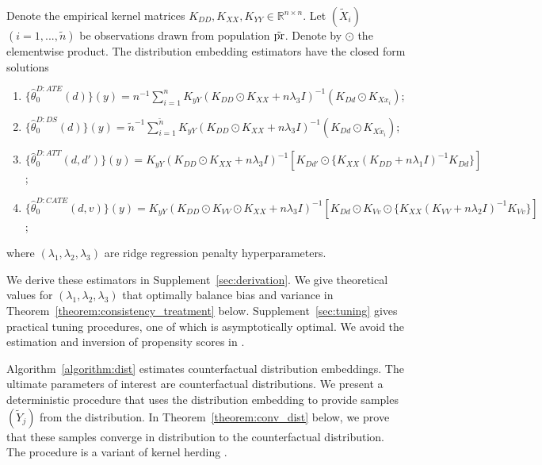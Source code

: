\begin{algorithm}\label{algorithm:dist}
Denote the empirical kernel matrices
$
K_{DD}, K_{XX}, K_{YY}\in\mathbb{R}^{n\times n}
$. Let $(\tilde{X}_i)$ $(i=1,...,\tilde{n})$ be observations drawn from population $\tilde{\text{\normalfont pr}}$. Denote by $\odot$ the elementwise product. The distribution embedding estimators have the closed form solutions
\begin{enumerate}
    \item $\{\hat{\theta}_0^{D:ATE}(d)\}(y)=n^{-1}\sum_{i=1}^n K_{yY}(K_{DD}\odot K_{XX}+n\lambda_3  I )^{-1}(K_{Dd}\odot K_{Xx_i})$;
    \item $\{\hat{\theta}_0^{D:DS}(d)\}(y)=\tilde{n}^{-1}\sum_{i=1}^{\tilde{n}} K_{yY}(K_{DD}\odot K_{XX}+n\lambda_3  I )^{-1}(K_{Dd}\odot K_{X\tilde{x}_i})$;
    \item $\{\hat{\theta}_0^{D:ATT}(d,d')\}(y)=K_{yY}(K_{DD}\odot K_{XX}+n\lambda_3  I )^{-1}[K_{Dd'}\odot \{K_{XX}(K_{DD}+n\lambda_1  I )^{-1}K_{Dd}\}]$;
     \item $\{\hat{\theta}_0^{D:CATE}(d,v)\}(y)=K_{yY}(K_{DD}\odot K_{VV}\odot K_{XX}+n\lambda_3  I )^{-1}[K_{Dd}\odot K_{Vv} \odot \{K_{XX}(K_{VV}+n\lambda_2  I )^{-1}K_{Vv}\}]$;
\end{enumerate}
where $(\lambda_1,\lambda_2,\lambda_3)$ are ridge regression penalty hyperparameters.%
\end{algorithm}
We derive these estimators in Supplement~\ref{sec:derivation}. We give theoretical values for $(\lambda_1,\lambda_2,\lambda_3)$ that optimally balance bias and variance in Theorem~\ref{theorem:consistency_treatment} below. Supplement~\ref{sec:tuning} gives practical tuning procedures, one of which is asymptotically optimal. 
We avoid the estimation and inversion of propensity scores in \cite[eq. 21]{muandet2021counterfactual}.

Algorithm~\ref{algorithm:dist} estimates counterfactual distribution embeddings. The ultimate parameters of interest are counterfactual distributions. We present a deterministic procedure that uses the distribution embedding to provide samples $(\tilde{Y}_j)$ from the distribution. In Theorem~\ref{theorem:conv_dist} below, we prove that these samples converge in distribution to the counterfactual distribution. The procedure is a variant of kernel herding  \cite{welling2009herding,muandet2021counterfactual}.

